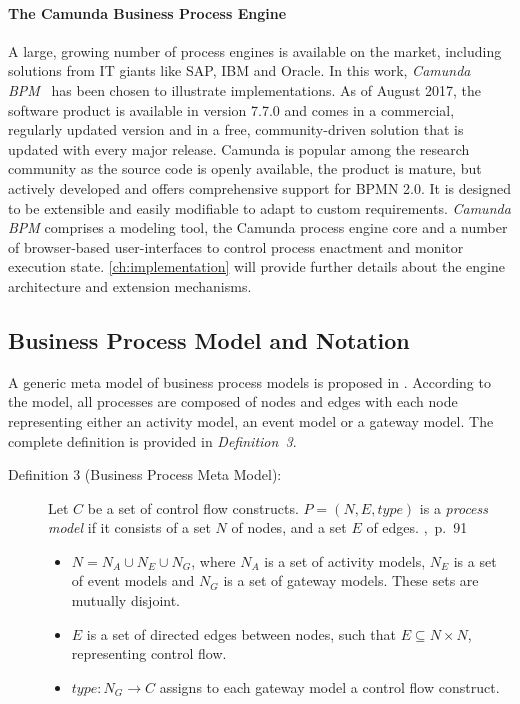 \paragraph{The Camunda Business Process Engine}
A large, growing number of process engines is available on the market, including solutions from IT giants like SAP, IBM and Oracle.
In this work, \emph{Camunda BPM}~\cite{camunda} has been chosen to illustrate implementations.
As of August 2017, the software product is available in version 7.7.0 and comes in a commercial, regularly updated version and in a free, community-driven solution that is updated with every major release.
Camunda is popular among the research community as the source code is openly available, the product is mature, but actively developed and offers comprehensive support for BPMN 2.0. It is designed to be extensible and easily modifiable to adapt to custom requirements.
\emph{Camunda BPM} comprises a modeling tool, the Camunda process engine core and a number of browser-based user-interfaces to control process enactment and monitor execution state.
\autoref{ch:implementation} will provide further details about the engine architecture and extension mechanisms.


\subsection{Business Process Model and Notation}

A generic meta model of business process models is proposed in \cite{weske:bpm-book}.
According to the model, all processes are composed of nodes and edges with each node representing either an activity model, an event model or a gateway model. The complete definition is provided in \textit{Definition~3}.

\begin{description}
	\item[Definition 3 (Business Process Meta Model):]
	Let $C$ be a set of control flow constructs. $P = (N,E,type)$ is a \textit{process model} if it consists of a set $N$ of nodes, and a set $E$ of edges. \cite{weske:bpm-book},~p.~91
	\begin{itemize} 
		\item
		$N = N_{A}\cup N_{E}\cup N_{G}$, where $N_{A}$ is a set of activity models, $N_{E}$ is a set of event models and $N_{G}$ is a set of gateway models. These sets are mutually disjoint.
		\item 
		$E$ is a set of directed edges between nodes, such that $E\subseteq N \times N$, representing control flow.
		\item
		$type:N_{G}\rightarrow C$ assigns to each gateway model a control flow construct.
	\end{itemize}
\end{description}


